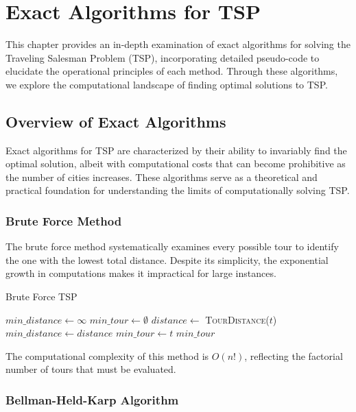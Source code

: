 \chapter{Exact Algorithms for TSP} \label{chapt:3}

This chapter provides an in-depth examination of exact algorithms for solving the Traveling Salesman Problem (TSP), incorporating detailed pseudo-code to elucidate the operational principles of each method. Through these algorithms, we explore the computational landscape of finding optimal solutions to TSP.

\section{Overview of Exact Algorithms}

Exact algorithms for TSP are characterized by their ability to invariably find the optimal solution, albeit with computational costs that can become prohibitive as the number of cities increases. These algorithms serve as a theoretical and practical foundation for understanding the limits of computationally solving TSP.

\subsection{Brute Force Method}

The brute force method systematically examines every possible tour to identify the one with the lowest total distance. Despite its simplicity, the exponential growth in computations makes it impractical for large instances.

\begin{algorithm}
	\caption{Brute Force TSP}\label{bruteforce}
	\begin{algorithmic}[1]
		\State $min\_distance \gets \infty$
		\State $min\_tour \gets \emptyset$
		\State $distance \gets$ \textsc{TourDistance}($t$)
		\State $min\_distance \gets distance$
		\State $min\_tour \gets t$
		\EndIf
		\EndFor
		\State \Return $min\_tour$
		\EndProcedure
	\end{algorithmic}
\end{algorithm}

The computational complexity of this method is $O(n!)$, reflecting the factorial number of tours that must be evaluated.

\subsection{Bellman-Held-Karp Algorithm}

